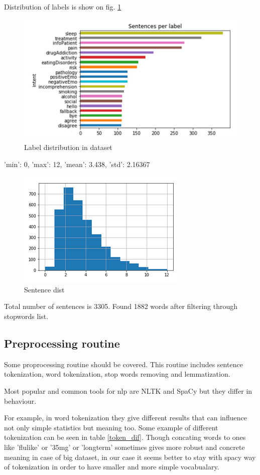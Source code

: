 \documentclass[11pt]{article}
\begin{document}
Distribution of labels is show on fig. \ref{figure:name}

 \begin{figure}[h]
 	\centering
 	\includegraphics[scale=0.5]{report1.png}
	\caption{Label distribution in dataset}
 \label{figure:name}
 \end{figure}


{'min': 0, 'max': 12, 'mean': 3.438, 'std': 2.16367}

 \begin{figure}[h]
 	\centering
 	\includegraphics[scale=0.4]{report4.png}
	\caption{Sentence dist}
 \label{words_freq}
 \end{figure}

Total number of sentences is 3305. Found 1882 words after filtering through stopwords list. 

\subsection{Preprocessing routine}

Some proprocessing routine should be covered. This routine includes sentence tokenization, word tokenization, stop words removing and lemmatization. 

Most popular and common tools for nlp are NLTK and SpaCy but they differ in behaviour.


For example, in word tokenization they give different results that can influence not only simple statistics but meaning too. Some example of different tokenization can be seen in table \ref{token_dif}. Though concating words to ones like 'flulike' or '35mg' or 'longterm' sometimes gives more robust and concrete meaning in case of big dataset, in our case it seems better to stay with spacy way of tokenization in order to have smaller and more simple vocabualary.
\end{document}
